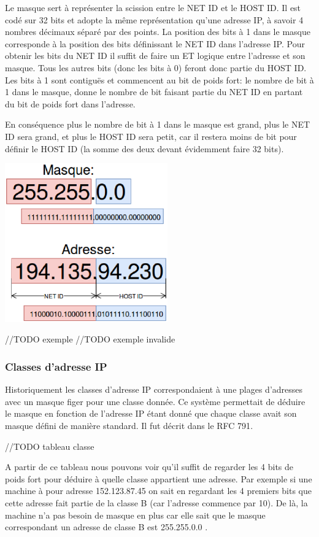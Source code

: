 Le masque sert à représenter la scission entre le NET ID et le HOST ID.
Il est codé sur 32 bits et adopte la même représentation qu'une adresse IP, à savoir
4 nombres décimaux séparé par des points.
La position des bits à 1 dans le masque corresponde à la position des bits définissant le NET ID dans l'adresse IP.
Pour obtenir les bits du NET ID il suffit de faire un ET logique entre l'adresse et son masque. Tous les autres bits (donc les bits à 0)
feront donc partie du HOST ID.
Les bits à 1 sont contiguës et commencent au bit de poids fort: le nombre de bit à 1 dans le masque, donne
le nombre de bit faisant partie du NET ID en partant du bit de poids fort dans l'adresse.

En conséquence plus le nombre de bit à 1 dans le masque est grand, plus le NET ID sera grand, et plus le HOST ID sera petit, car il restera moins de bit pour définir le HOST ID (la somme des deux devant évidemment faire 32 bits).

\begin{center}
\includegraphics[width=7cm]{./pics/maskipv4.eps}
\end{center}

//TODO exemple
//TODO exemple invalide

\subsubsection{Classes d'adresse IP}
Historiquement les classes d'adresse IP correspondaient à une plages d'adresses avec un masque figer pour une classe donnée.
Ce système permettait de déduire le masque en fonction
de l'adresse IP étant donné que chaque classe avait son masque défini de manière standard.
Il fut décrit dans le RFC 791\cite{url-RFC-791}.

//TODO tableau classe

A partir de ce tableau nous pouvons voir qu'il suffit de regarder les 4 bits de
poids fort pour déduire à quelle classe appartient une adresse.  Par exemple si
une machine à pour adresse 152.123.87.45 on sait en regardant les 4 premiers
bits que cette adresse fait partie de la classe B (car l'adresse commence par
10). De là, la machine n'a pas besoin de masque en plus car elle sait que le
masque correspondant un adresse de classe B est 255.255.0.0 .


